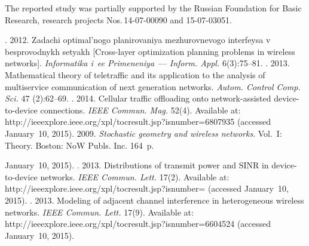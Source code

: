 
\Ack
\noindent
The reported study was partially supported by the Russian Foundation for Basic
Research,  research projects Nos.\,14-07-00090 and
15-07-03051.




  \begin{multicols}{2}

\renewcommand{\bibname}{\protect\rmfamily References}



{\small\frenchspacing
 {%
 \begin{thebibliography}{99}
. 2012.
Zadachi optimal'nogo planirovaniya mezhurovnevogo interfeysa v besprovodnykh setyakh
[Cross-layer optimization planning problems in wireless networks]. \textit{Informatika i~ee
Primeneniya}~--- \textit{Inform. Appl.} 6(3):75--81.
. 2013. Mathematical theory of
teletraffic and its application to the analysis of multiservice communication of next generation
networks. \textit{Autom. Control Comp. Sci.} 47 (2):62--69.
. 2014. Cellular
traffic offloading onto network-assisted device-to-device connections. \textit{IEEE
Commun. Mag.} 52(4). Available at: {\sf
http://ieeexplore.ieee.\linebreak org/xpl/tocresult.jsp?isnumber=6807935} (accessed January~10, 2015).
 2009. \textit{Stochastic geometry and wireless networks}.
Vol.~I: Theory. Boston: NoW Publs. Inc. 164~p.



January~10, 2015). %
. 2013. Distributions of transmit
power and SINR in device-to-device networks. \textit{IEEE Commun. Lett.} 17(2).
Available at: {\sf http://ieeexplore.ieee.org/xpl/tocresult.jsp?isnumber=} (accessed
January~10, 2015).
. 2013. Modeling of adjacent channel
interference in heterogeneous wireless networks. \textit{IEEE Commun. Lett.} 17(9).
Available at: {\sf http://ieeexplore.ieee.org/\linebreak xpl/tocresult.jsp?isnumber=6604524} (accessed
January~10, 2015).


\end{thebibliography}}}
\end{multicols}
